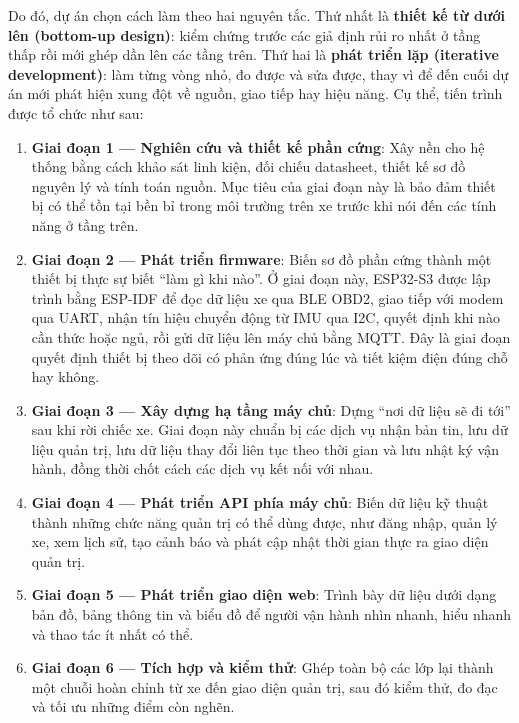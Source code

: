 \documentclass[a4paper]{extarticle}
\providecommand{\tightlist}{%
  \setlength{\itemsep}{0pt}\setlength{\parskip}{0pt}}
\begin{document}
Do đó, dự án chọn cách làm theo hai nguyên tắc. Thứ nhất là \textbf{thiết
kế từ dưới lên (bottom-up design)}: kiểm chứng trước các giả định rủi ro
nhất ở tầng thấp rồi mới ghép dần lên các tầng trên. Thứ hai là
\textbf{phát triển lặp (iterative development)}: làm từng vòng nhỏ, đo
được và sửa được, thay vì để đến cuối dự án mới phát hiện xung đột về
nguồn, giao tiếp hay hiệu năng. Cụ thể, tiến trình được tổ chức như sau:

\begin{enumerate}
\def\labelenumi{\arabic{enumi}.}
\tightlist
\item
  \textbf{Giai đoạn 1 --- Nghiên cứu và thiết kế phần cứng}: Xây nền cho
  hệ thống bằng cách khảo sát linh kiện, đối chiếu datasheet, thiết kế
  sơ đồ nguyên lý và tính toán nguồn. Mục tiêu của giai đoạn này là bảo
  đảm thiết bị có thể tồn tại bền bỉ trong môi trường trên xe trước khi
  nói đến các tính năng ở tầng trên.
\item
  \textbf{Giai đoạn 2 --- Phát triển firmware}: Biến sơ đồ phần cứng
  thành một thiết bị thực sự biết ``làm gì khi nào''. Ở giai đoạn này,
  ESP32-S3 được lập trình bằng ESP-IDF để đọc dữ liệu xe qua BLE OBD2,
  giao tiếp với modem qua UART, nhận tín hiệu chuyển động từ IMU qua
  I2C, quyết định khi nào cần thức hoặc ngủ, rồi gửi dữ liệu lên máy chủ
  bằng MQTT. Đây là giai đoạn quyết định thiết bị theo dõi có phản ứng đúng lúc và
  tiết kiệm điện đúng chỗ hay không.
\item
  \textbf{Giai đoạn 3 --- Xây dựng hạ tầng máy chủ}: Dựng ``nơi dữ liệu
  sẽ đi tới'' sau khi rời chiếc xe. Giai đoạn này chuẩn bị các dịch vụ
  nhận bản tin, lưu dữ liệu quản trị, lưu dữ liệu thay đổi liên tục theo
  thời gian và lưu nhật ký vận hành, đồng thời chốt cách các dịch vụ kết
  nối với nhau.
\item
  \textbf{Giai đoạn 4 --- Phát triển API phía máy chủ}: Biến dữ liệu kỹ thuật
  thành những chức năng quản trị có thể dùng được, như đăng nhập, quản
  lý xe, xem lịch sử, tạo cảnh báo và phát cập nhật thời gian thực ra
  giao diện quản trị.
\item
  \textbf{Giai đoạn 5 --- Phát triển giao diện web}: Trình bày dữ liệu dưới
  dạng bản đồ, bảng thông tin và biểu đồ để người vận hành nhìn nhanh,
  hiểu nhanh và thao tác ít nhất có thể.
\item
  \textbf{Giai đoạn 6 --- Tích hợp và kiểm thử}: Ghép toàn bộ các lớp
  lại thành một chuỗi hoàn chỉnh từ xe đến giao diện quản trị, sau đó kiểm thử,
  đo đạc và tối ưu những điểm còn nghẽn.
\end{enumerate}
\end{document}
